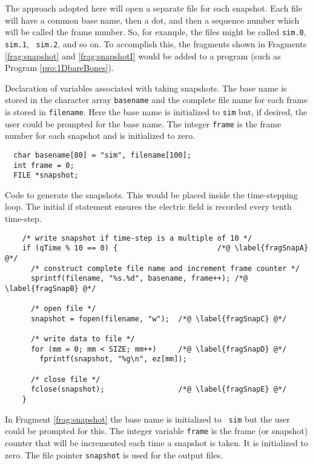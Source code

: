 The approach adopted here will open a separate file for each snapshot.
Each file will have a common base name, then a dot, and then a
sequence number which will be called the frame number.  So, for
example, the files might be called {\tt sim.0}, {\tt sim.1}, {\tt
sim.2}, and so on.  To accomplish this, the fragments shown in
Fragments \ref{frag:snapshot} and \ref{frag:snapshotI} would be added to a
program (such as Program \ref{pro:1DbareBones}).
\begin{fragment}
  Declaration of variables associated with taking snapshots.  The base
  name is stored in the character array {\tt basename} and the
  complete file name for each frame is stored in {\tt filename}.  Here
  the base name is initialized to {\tt sim} but, if desired, the user
  could be prompted for the base name.  The integer {\tt frame} is the
  frame number for each snapshot and is initialized to
  zero. \label{frag:snapshot}
  \codemiddle
\begin{lstlisting}
  char basename[80] = "sim", filename[100];
  int frame = 0;
  FILE *snapshot;
\end{lstlisting}
\end{fragment}
\begin{fragment}
  Code to generate the snapshots.  This would be placed inside the
  time-stepping loop.  The initial if statement ensures the electric
  field is recorded every tenth time-step.\label{frag:snapshotI}
  \codemiddle
\begin{lstlisting}
    /* write snapshot if time-step is a multiple of 10 */
    if (qTime % 10 == 0) {                       /*@ \label{fragSnapA} @*/
      /* construct complete file name and increment frame counter */
      sprintf(filename, "%s.%d", basename, frame++); /*@ \label{fragSnapB} @*/

      /* open file */
      snapshot = fopen(filename, "w");  /*@ \label{fragSnapC} @*/

      /* write data to file */
      for (mm = 0; mm < SIZE; mm++)     /*@ \label{fragSnapD} @*/
        fprintf(snapshot, "%g\n", ez[mm]);

      /* close file */
      fclose(snapshot);                 /*@ \label{fragSnapE} @*/
    }
\end{lstlisting}
\end{fragment}

In Fragment \ref{frag:snapshot} the base name is initialized to {\tt
  sim} but the user could be prompted for this.  The integer variable
{\tt frame} is the frame (or snapshot) counter that will be
incremented each time a snapshot is taken.  It is initialized to zero.
The file pointer {\tt snapshot} is used for the output files.

